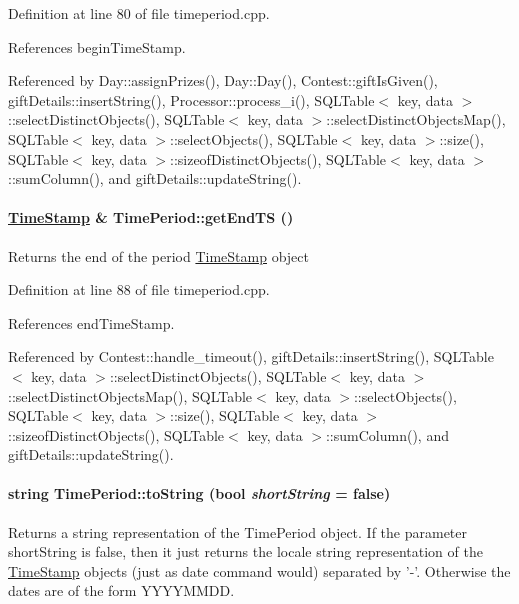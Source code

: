 Definition at line 80 of file timeperiod.cpp.

References begin\-Time\-Stamp.

Referenced by Day::assign\-Prizes(), Day::Day(), Contest::gift\-Is\-Given(), gift\-Details::insert\-String(), Processor::process\_\-i(), SQLTable$<$ key, data $>$::select\-Distinct\-Objects(), SQLTable$<$ key, data $>$::select\-Distinct\-Objects\-Map(), SQLTable$<$ key, data $>$::select\-Objects(), SQLTable$<$ key, data $>$::size(), SQLTable$<$ key, data $>$::sizeof\-Distinct\-Objects(), SQLTable$<$ key, data $>$::sum\-Column(), and gift\-Details::update\-String().\hypertarget{classTimePeriod_TimePerioda5}{
\paragraph[getEndTS]{\setlength{\rightskip}{0pt plus 5cm}\hyperlink{classTimeStamp}{Time\-Stamp} \& Time\-Period::get\-End\-TS ()}\hfill}
\label{classTimePeriod_TimePerioda5}


Returns the end of the period \hyperlink{classTimeStamp}{Time\-Stamp} object 

Definition at line 88 of file timeperiod.cpp.

References end\-Time\-Stamp.

Referenced by Contest::handle\_\-timeout(), gift\-Details::insert\-String(), SQLTable$<$ key, data $>$::select\-Distinct\-Objects(), SQLTable$<$ key, data $>$::select\-Distinct\-Objects\-Map(), SQLTable$<$ key, data $>$::select\-Objects(), SQLTable$<$ key, data $>$::size(), SQLTable$<$ key, data $>$::sizeof\-Distinct\-Objects(), SQLTable$<$ key, data $>$::sum\-Column(), and gift\-Details::update\-String().\hypertarget{classTimePeriod_TimePerioda8}{
\paragraph[toString]{\setlength{\rightskip}{0pt plus 5cm}string Time\-Period::to\-String (bool {\em short\-String} = false)}\hfill}
\label{classTimePeriod_TimePerioda8}


Returns a string representation of the Time\-Period object. If the parameter short\-String is false, then it just returns the locale string representation of the \hyperlink{classTimeStamp}{Time\-Stamp} objects (just as date command would) separated by '-'. Otherwise the dates are of the form YYYYMMDD. 

